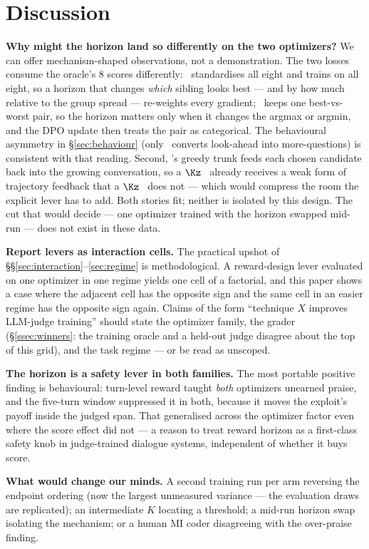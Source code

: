 \section{Discussion}
\label{sec:discussion}

\textbf{Why might the horizon land so differently on the two optimizers?} We can offer
mechanism-shaped observations, not a demonstration. The two losses consume the oracle's $8$
scores differently: \GRPO\ standardises all eight and trains on all eight, so a horizon that
changes \emph{which} sibling looks best --- and by how much relative to the group spread ---
re-weights every gradient; \PTO\ keeps one best-vs-worst pair, so the horizon matters only when
it changes the argmax or argmin, and the DPO update then treats the pair as categorical. The
behavioural asymmetry in \S\ref{sec:behaviour} (only \GRPO\ converts look-ahead into
more-questions) is consistent with that reading. Second, \PTO's greedy trunk feeds each chosen
candidate back into the growing conversation, so a $\Kz$ \PTO\ already receives a weak form of
trajectory feedback that a $\Kz$ \GRPO\ does not --- which would compress the room the explicit
lever has to add. Both stories fit; neither is isolated by this design. The cut that would decide
--- one optimizer trained with the horizon swapped mid-run --- does not exist in these data.

\textbf{Report levers as interaction cells.} The practical upshot of
\S\S\ref{sec:interaction}--\ref{sec:regime} is methodological. A reward-design lever evaluated on
one optimizer in one regime yields one cell of a factorial, and this paper shows a case where the
adjacent cell has the opposite sign and the same cell in an easier regime has the opposite sign
again. Claims of the form ``technique $X$ improves LLM-judge training'' should state the
optimizer family, the grader (\S\ref{ssec:winners}: the training oracle and a held-out judge
disagree about the top of this grid), and the task regime --- or be read as unscoped.

\textbf{The horizon is a safety lever in both families.} The most portable positive finding is
behavioural: turn-level reward taught \emph{both} optimizers unearned praise, and the five-turn
window suppressed it in both, because it moves the exploit's payoff inside the judged span. That
generalised across the optimizer factor even where the score effect did not --- a reason to treat
reward horizon as a first-class safety knob in judge-trained dialogue systems, independent of
whether it buys score.

\textbf{What would change our minds.} A second training run per arm reversing the endpoint
ordering (now the largest unmeasured variance --- the evaluation draws are replicated); an
intermediate $K$ locating a threshold; a mid-run horizon swap isolating the mechanism; or a human
MI coder disagreeing with the over-praise finding.
